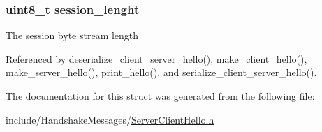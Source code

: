 \subsubsection[{\texorpdfstring{session\+\_\+lenght}{session_lenght}}]{\setlength{\rightskip}{0pt plus 5cm}uint8\+\_\+t session\+\_\+lenght}\hypertarget{structsession__id__t_a9215daa8dba2536b15b9029e18017c3a}{}\label{structsession__id__t_a9215daa8dba2536b15b9029e18017c3a}
The session byte stream length 

Referenced by deserialize\+\_\+client\+\_\+server\+\_\+hello(), make\+\_\+client\+\_\+hello(), make\+\_\+server\+\_\+hello(), print\+\_\+hello(), and serialize\+\_\+client\+\_\+server\+\_\+hello().



The documentation for this struct was generated from the following file\+:\begin{DoxyCompactItemize}
\item 
include/\+Handshake\+Messages/\hyperlink{_server_client_hello_8h}{Server\+Client\+Hello.\+h}\end{DoxyCompactItemize}
